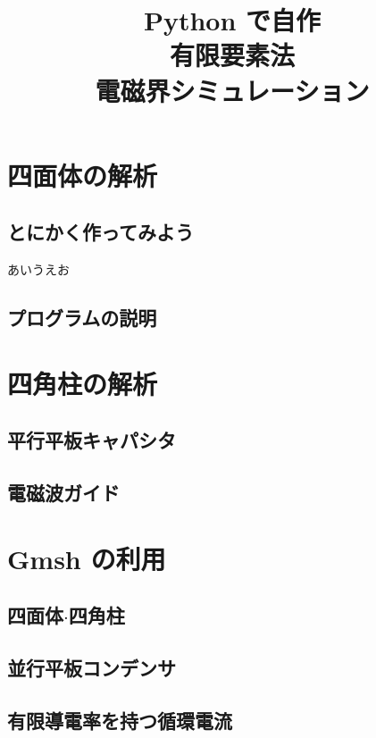 \documentclass[a4j]{jsbook}
\title{Python で自作\\有限要素法\\電磁界シミュレーション}
\author{}
\date{}
\begin{document}
\maketitle

\tableofcontents

\chapter{四面体の解析}

\section{とにかく作ってみよう}
あいうえお

\section{プログラムの説明}



\chapter{四角柱の解析}

\section{平行平板キャパシタ}

\section{電磁波ガイド}

\chapter{Gmsh の利用}

\section{四面体$\cdot$四角柱}

\section{並行平板コンデンサ}

\section{有限導電率を持つ循環電流}
\end{document}

